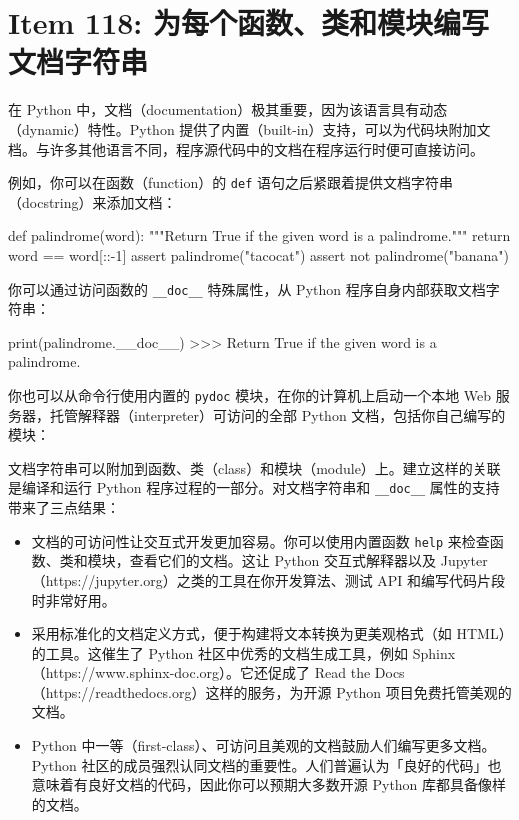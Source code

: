 \section{Item 118: 为每个函数、类和模块编写文档字符串}

在 Python 中，文档（documentation）极其重要，因为该语言具有动态（dynamic）特性。Python 提供了内置（built-in）支持，可以为代码块附加文档。与许多其他语言不同，程序源代码中的文档在程序运行时便可直接访问。

例如，你可以在函数（function）的 \texttt{def} 语句之后紧跟着提供文档字符串（docstring）来添加文档：

\begin{codebox}[python]
def palindrome(word):
    """Return True if the given word is a palindrome."""
    return word == word[::-1]
assert palindrome("tacocat")
assert not palindrome("banana")
\end{codebox}

你可以通过访问函数的 \texttt{\_\_doc\_\_} 特殊属性，从 Python 程序自身内部获取文档字符串：

\begin{codebox}[python]
print(palindrome.__doc__)
>>>
Return True if the given word is a palindrome.
\end{codebox}

你也可以从命令行使用内置的 \texttt{pydoc} 模块，在你的计算机上启动一个本地 Web 服务器，托管解释器（interpreter）可访问的全部 Python 文档，包括你自己编写的模块：


文档字符串可以附加到函数、类（class）和模块（module）上。建立这样的关联是编译和运行 Python 程序过程的一部分。对文档字符串和 \texttt{\_\_doc\_\_} 属性的支持带来了三点结果：

\begin{itemize}
\item 文档的可访问性让交互式开发更加容易。你可以使用内置函数 \texttt{help} 来检查函数、类和模块，查看它们的文档。这让 Python 交互式解释器以及 Jupyter（https://jupyter.org）之类的工具在你开发算法、测试 API 和编写代码片段时非常好用。
\item 采用标准化的文档定义方式，便于构建将文本转换为更美观格式（如 HTML）的工具。这催生了 Python 社区中优秀的文档生成工具，例如 Sphinx（https://www.sphinx-doc.org）。它还促成了 Read the Docs（https://readthedocs.org）这样的服务，为开源 Python 项目免费托管美观的文档。
\item Python 中一等（first-class）、可访问且美观的文档鼓励人们编写更多文档。Python 社区的成员强烈认同文档的重要性。人们普遍认为「良好的代码」也意味着有良好文档的代码，因此你可以预期大多数开源 Python 库都具备像样的文档。
\end{itemize}

